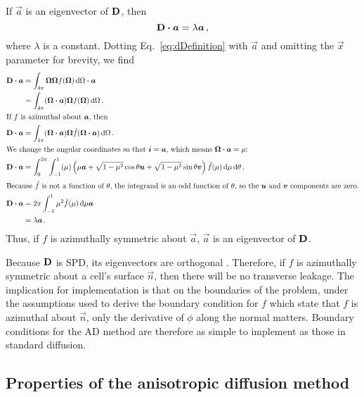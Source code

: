 If $\vec{a}$ is an eigenvector of $\mathbf{D}$, then
\begin{equation*}
  \mathbf{D} \bm{\cdot} \bm{a} = \lambda \bm{a}\,,
\end{equation*}
where $\lambda$ is a constant. Dotting Eq.~\eqref{eq:dDefinition} with
$\vec{a}$ and omitting the $\vec{x}$ parameter for brevity, we find
\begin{align*}
  \mathbf{D} \bm{\cdot} \bm{a}
  &= \int_{4\pi} \bm{\Omega} \bm{\Omega} f(\bm{\Omega}) \mathop{}\!\mathrm{d}\Omega \bm{\cdot} \bm{a}
  \\
  &= \int_{4\pi} (\bm{\Omega} \bm{\cdot} \bm{a}) \bm{\Omega} f(\bm{\Omega}) \mathop{}\!\mathrm{d}\Omega
  \,.
  \\ 
  \intertext{If $f$ is azimuthal about $\bm{a}$, then}
  \mathbf{D} \bm{\cdot} \bm{a}
  &= \int_{4\pi} (\bm{\Omega} \bm{\cdot} \bm{a}) \bm{\Omega}
    \hat f(\bm{\Omega} \bm{\cdot} \bm{a}) \mathop{}\!\mathrm{d}\Omega \,.
  \\ 
  \intertext{We change the angular coordinates so that $\bm{i}=\bm{a}$, which
  means $\bm{\Omega} \bm{\cdot} \bm{a}=\mu$:}
  \mathbf{D} \bm{\cdot} \bm{a}
  &= \int_{0}^{2\pi} \int_{-1}^{1} (\mu)
  \left( \mu \bm{a} + \sqrt{1-\mu^2} \cos \theta \bm{u} + \sqrt{1-\mu^2} \sin
  \theta \bm{v} \right) \hat f(\mu) \mathop{}\!\mathrm{d}\mu \mathop{}\!\mathrm{d}\theta \,.
\\ 
\intertext{Because $\hat f$ is not a function of $\theta$, the integrand is an
odd function of $\theta$, so the $\bm{u}$ and $\bm{v}$ components are zero.}
  \mathbf{D} \bm{\cdot} \bm{a}
  &= 2\pi \int_{-1}^{1} \mu^2 \hat f(\mu) \mathop{}\!\mathrm{d}\mu \bm{a}
  \\
  &= \lambda \bm{a} \,.
\end{align*}
Thus, if $f$ is azimuthally symmetric about $\vec{a}$, $\vec{a}$ is an
eigenvector of $\mathbf{D}$.

Because $\mathbf{D}$ is SPD, its eigenvectors are orthogonal \cite[p.173]{Tre1997}.
Therefore, if $f$ is azimuthally symmetric about a cell's surface $\vec{n}$,
then there will be no transverse leakage. The implication for implementation
is that on the boundaries of the problem, under the assumptions used to derive
the boundary condition for $f$ which state that $f$ is azimuthal about
$\vec{n}$, only the derivative of $\phi$ along the normal matters. Boundary
conditions for the AD method are therefore as simple to implement as those in standard diffusion.

\subsection{Properties of the anisotropic diffusion method}

